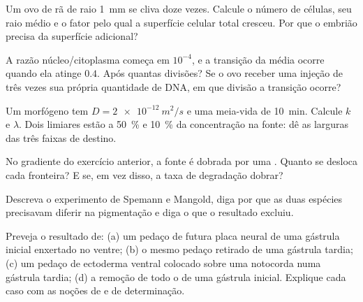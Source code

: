 \begin{exercise}[$\star\star$]\label{exo:b2:vertebrate-development:5}
Um ovo de rã de raio \qty{1}{mm} se cliva doze vezes. Calcule o número
de células, seu raio médio e o fator pelo qual a superfície celular
total cresceu. Por que o embrião precisa da superfície adicional?
\end{exercise}

\begin{exercise}[$\star\star$]\label{exo:b2:vertebrate-development:6}
A razão núcleo/citoplasma começa em $10^{-4}$, e a transição da
 média ocorre quando ela atinge $0.4$. Após quantas divisões?
Se o ovo receber uma injeção de três vezes sua própria quantidade de
DNA, em que divisão a transição ocorre?
\end{exercise}

\begin{exercise}[$\star\star$]\label{exo:b2:vertebrate-development:7}
Um morfógeno tem $D = \qty{2e-12}{m^2/s}$ e uma meia-vida de
\qty{10}{min}. Calcule $k$ e $\lambda$. Dois limiares estão a
\qty{50}{\%} e \qty{10}{\%} da concentração na fonte: dê as larguras das
três faixas de destino.
\end{exercise}

\begin{exercise}[$\star\star$]\label{exo:b2:vertebrate-development:8}
No gradiente do exercício anterior, a fonte é dobrada por uma .
Quanto se desloca cada fronteira? E se, em vez disso, a taxa de
degradação dobrar?
\end{exercise}

\begin{exercise}[$\star\star$]\label{exo:b2:vertebrate-development:9}
Descreva o experimento de Spemann e Mangold, diga por que as duas
espécies precisavam diferir na pigmentação e diga o que o resultado
excluiu.
\end{exercise}

\begin{exercise}[$\star\star\star$]\label{exo:b2:vertebrate-development:10}
Preveja o resultado de: (a) um pedaço de futura placa neural de uma
gástrula inicial enxertado no ventre; (b) o mesmo pedaço retirado de
uma gástrula tardia; (c) um pedaço de ectoderma ventral colocado sobre
uma notocorda numa gástrula tardia; (d) a remoção de todo o 
de uma gástrula inicial. Explique cada caso com as noções de
 e de determinação.
\end{exercise}

